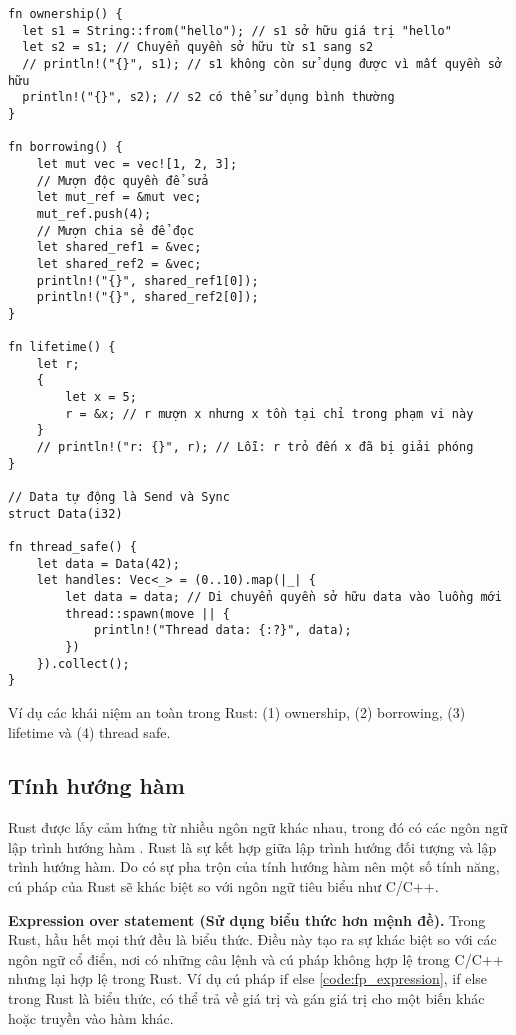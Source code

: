 \begin{listing}[H]
\begin{verbatim}
fn ownership() {
  let s1 = String::from("hello"); // s1 sở hữu giá trị "hello"
  let s2 = s1; // Chuyển quyền sở hữu từ s1 sang s2
  // println!("{}", s1); // s1 không còn sử dụng được vì mất quyền sở hữu
  println!("{}", s2); // s2 có thể sử dụng bình thường
}

fn borrowing() {
    let mut vec = vec![1, 2, 3];
    // Mượn độc quyền để sửa
    let mut_ref = &mut vec;
    mut_ref.push(4);
    // Mượn chia sẻ để đọc
    let shared_ref1 = &vec;
    let shared_ref2 = &vec;
    println!("{}", shared_ref1[0]);
    println!("{}", shared_ref2[0]);
}

fn lifetime() {
    let r;
    {
        let x = 5;
        r = &x; // r mượn x nhưng x tồn tại chỉ trong phạm vi này
    }
    // println!("r: {}", r); // Lỗi: r trỏ đến x đã bị giải phóng
}

// Data tự động là Send và Sync
struct Data(i32)

fn thread_safe() {
    let data = Data(42);
    let handles: Vec<_> = (0..10).map(|_| {
        let data = data; // Di chuyển quyền sở hữu data vào luồng mới
        thread::spawn(move || {
            println!("Thread data: {:?}", data);
        })
    }).collect();
}
\end{verbatim}
\caption{Ví dụ các khái niệm an toàn trong Rust: (1) ownership, (2) borrowing, (3) lifetime và (4) thread safe.}
\label{code:c2_safe_rust}
\end{listing}

\subsection{Tính hướng hàm}

Rust được lấy cảm hứng từ nhiều ngôn ngữ khác nhau, trong đó có các ngôn ngữ lập trình hướng hàm \cite{hughes1989functional}.
Rust là sự kết hợp giữa lập trình hướng đối tượng và lập trình hướng hàm.
Do có sự pha trộn của tính hướng hàm nên một số tính năng, cú pháp của Rust sẽ khác biệt so với ngôn ngữ tiêu biểu như C/C++.

\textbf{Expression over statement (Sử dụng biểu thức hơn mệnh đề).}
Trong Rust, hầu hết mọi thứ đều là biểu thức.
Điều này tạo ra sự khác biệt so với các ngôn ngữ cổ điển, nơi có những câu lệnh và cú pháp không hợp lệ trong C/C++ nhưng lại hợp lệ trong Rust.
Ví dụ cú pháp if else \ref{code:fp_expression}, if else trong Rust là biểu thức, có thể trả về giá trị và gán giá trị cho một biến khác hoặc truyền vào hàm khác.

